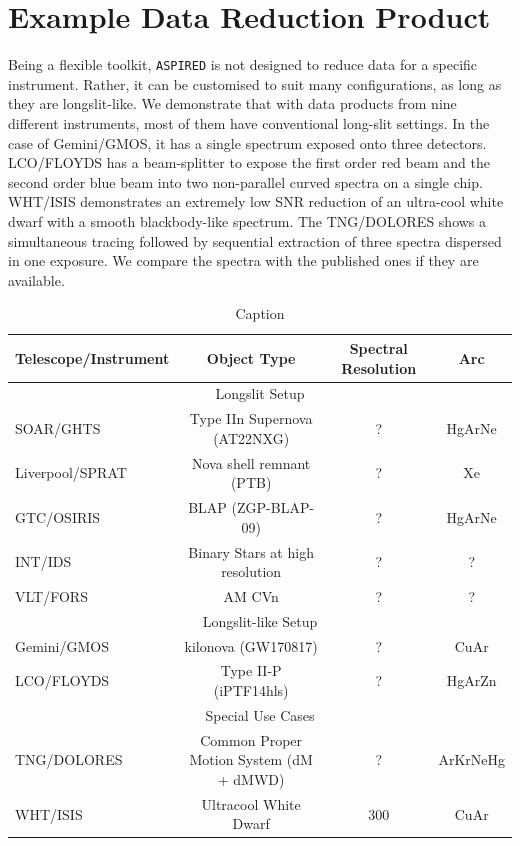 \documentclass[twocolumn, linenumbers]{aastex631}
\begin{document}
\section{Example Data Reduction Product}
Being a flexible toolkit, \texttt{ASPIRED} is not designed to reduce data for a
specific instrument. Rather, it can be customised to suit many configurations,
as long as they are longslit-like. We demonstrate that with data products
from nine different instruments, most of them have conventional long-slit settings.
In the case of Gemini/GMOS, it has a single spectrum exposed onto three detectors.
LCO/FLOYDS has a beam-splitter to expose the first order red beam and the
second order blue beam into two non-parallel curved spectra on a single chip.
WHT/ISIS demonstrates an extremely low SNR reduction of an ultra-cool white
dwarf with a smooth blackbody-like spectrum. The TNG/DOLORES shows a
simultaneous tracing followed by sequential extraction of three spectra
dispersed in one exposure. We compare the spectra with the published ones if they are available.

\begin{table}
    \centering
    \begin{tabular}{l|c|c|c}\hline
        Telescope/Instrument & Object Type                                 & Spectral Resolution & Arc \\\hline\hline
        \multicolumn{4}{c}{Longslit Setup}\\\hline
        SOAR/GHTS            & Type IIn Supernova (AT22NXG)                & ?                   & HgArNe \\
        Liverpool/SPRAT      & Nova shell remnant (PTB)                    & ?                   & Xe \\
        GTC/OSIRIS           & BLAP (ZGP-BLAP-09) & ?                   & HgArNe \\
        INT/IDS              & Binary Stars at high resolution             & ?                   & ? \\
        VLT/FORS             & AM CVn                                      & ?                   & ? \\\hline
        \multicolumn{4}{c}{Longslit-like Setup}\\\hline
        Gemini/GMOS          & kilonova (GW170817)                         & ?                   & CuAr \\
        LCO/FLOYDS           & Type II-P (iPTF14hls)                       & ?                   & HgArZn \\\hline
        \multicolumn{4}{c}{Special Use Cases}\\\hline
        TNG/DOLORES          & Common Proper Motion System (dM + dMWD)     & ?                   & ArKrNeHg \\
        WHT/ISIS             & Ultracool White Dwarf                       & 300                 & CuAr \\\hline
\end{tabular}
    \caption{Caption}
    \label{tab:my_label}
\end{table}
\end{document}
